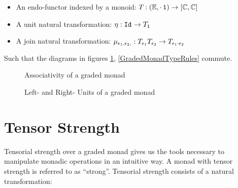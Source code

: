\documentclass{Report}
\begin{document}
\begin{itemize}
    \item An endo-functor indexed by a monoid: $T_{}{}: (\mathbb{E}, \cdot\, \texttt{1})  \rightarrow [\mathbb{C}, \mathbb{C}]$
    \item A unit natural transformation: $\eta_{}: \texttt{Id}_{} \rightarrow T_{\texttt{1}}{}$
    \item A join natural transformation: $\mu_{\epsilon_1, \epsilon_2, }: T_{\epsilon_1}{T_{\epsilon_2}{}} \rightarrow T_{\epsilon_1 \cdot \epsilon_2}{}$
\end{itemize}

Such that the diagrams in figures \ref{GradedMonadAssociativity}, \ref{GradedMonadTypeRules} commute.


\begin{figure}
    \centering
    \begin{minipage}{0.45\textwidth}
        \centering
        \caption{Associativity of a graded monad}
        \label{GradedMonadAssociativity}
    \end{minipage}\hfill
    \begin{minipage}{0.45\textwidth}
        \centering
        \caption{Left- and Right- Units of a graded monad}
    \end{minipage}
\end{figure}


\section{Tensor Strength}
Tensorial strength over a graded monad gives us the tools necessary to manipulate monadic operations in an intuitive way. A monad with tensor strength is referred to as ``strong''. Tensorial strength consists of a natural transformation:
\end{document}
